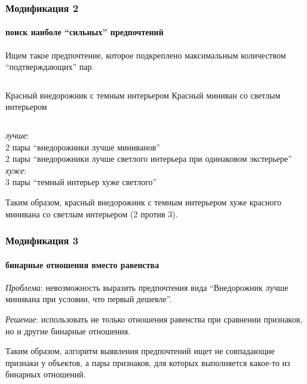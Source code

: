 \documentclass[xcolor=table,handout]{beamer}
\theoremstyle{definition}
\begin{document}
	\begin{frame}
		\frametitle{Модификация 2}
		\framesubtitle{поиск наиболе ``сильных'' предпочтений}
		Ищем такое предпочтение, которое подкреплено максимальным количеством ``подтверждающих'' пар.
		\vspace{1.4em}
		\begin{columns}[c] 
			Красный внедорожник с темным интерьером
			Красный миниван со светлым интерьером
		\end{columns}
		\begin{center}
			\vspace{0.5em}
			\emph{лучше}: \\ 
			2 пары ``внедорожники лучше миниванов'' \\
			2 пары ``внедорожники лучше светлого интерьера при одинаковом экстерьере'' \\
			\vspace{1em}
			\emph{хуже}: \\
			3 пары ``темный интерьер хуже светлого''
		\end{center}
		
		\vspace{1.5em}
		Таким образом, красный внедорожник с темным интерьером {\color{red} хуже} красного минивана со светлым интерьером (2 против 3).
	\end{frame}
	
	\begin{frame}
		\frametitle{Модификация 3}
		\framesubtitle{бинарные отношения вместо равенства}
		
		\emph{Проблема}: невозможность выразить предпочтения вида ``Внедорожник лучше минивана при условии, что первый дешевле''.
		
		\pause
		
		\vspace{1em}
		\emph{Решение}: использовать не только отношения равенства при сравнении признаков, но и другие бинарные отношения.
		
		\pause
		
		\vspace{1em}
		Таким образом, алгоритм выявления предпочтений ищет не совпадающие признаки у объектов, а пары признаков, для которых выполняется какое-то из бинарных отношений.
	\end{frame}
	
\end{document}
